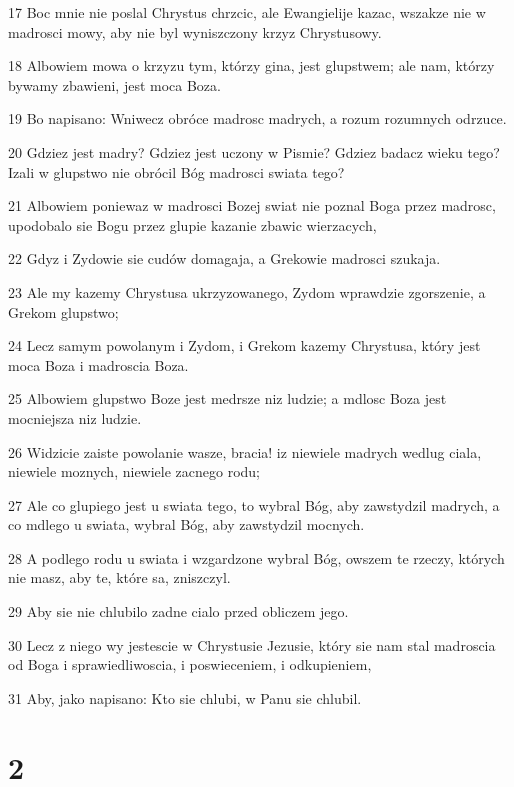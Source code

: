 \par 17 Boc mnie nie poslal Chrystus chrzcic, ale Ewangielije kazac, wszakze nie w madrosci mowy, aby nie byl wyniszczony krzyz Chrystusowy.
\par 18 Albowiem mowa o krzyzu tym, którzy gina, jest glupstwem; ale nam, którzy bywamy zbawieni, jest moca Boza.
\par 19 Bo napisano: Wniwecz obróce madrosc madrych, a rozum rozumnych odrzuce.
\par 20 Gdziez jest madry? Gdziez jest uczony w Pismie? Gdziez badacz wieku tego? Izali w glupstwo nie obrócil Bóg madrosci swiata tego?
\par 21 Albowiem poniewaz w madrosci Bozej swiat nie poznal Boga przez madrosc, upodobalo sie Bogu przez glupie kazanie zbawic wierzacych,
\par 22 Gdyz i Zydowie sie cudów domagaja, a Grekowie madrosci szukaja.
\par 23 Ale my kazemy Chrystusa ukrzyzowanego, Zydom wprawdzie zgorszenie, a Grekom glupstwo;
\par 24 Lecz samym powolanym i Zydom, i Grekom kazemy Chrystusa, który jest moca Boza i madroscia Boza.
\par 25 Albowiem glupstwo Boze jest medrsze niz ludzie; a mdlosc Boza jest mocniejsza niz ludzie.
\par 26 Widzicie zaiste powolanie wasze, bracia! iz niewiele madrych wedlug ciala, niewiele moznych, niewiele zacnego rodu;
\par 27 Ale co glupiego jest u swiata tego, to wybral Bóg, aby zawstydzil madrych, a co mdlego u swiata, wybral Bóg, aby zawstydzil mocnych.
\par 28 A podlego rodu u swiata i wzgardzone wybral Bóg, owszem te rzeczy, których nie masz, aby te, które sa, zniszczyl.
\par 29 Aby sie nie chlubilo zadne cialo przed obliczem jego.
\par 30 Lecz z niego wy jestescie w Chrystusie Jezusie, który sie nam stal madroscia od Boga i sprawiedliwoscia, i poswieceniem, i odkupieniem,
\par 31 Aby, jako napisano: Kto sie chlubi, w Panu sie chlubil.

\chapter{2}

